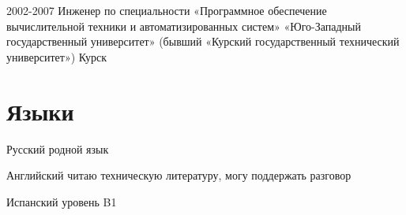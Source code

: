 \documentclass[11pt,a4paper,sans]{moderncv}
\newcommand{\lang}[2]{#1}
\begin{document}
\cventry
    {2002-2007}
    {\lang
        {Инженер по специальности «Программное обеспечение вычислительной техники и автоматизированных систем»}
        {Software of computer facilities and automated systems}}
    {\lang
        {«Юго-Западный государственный университет» (бывший «Курский государственный технический университет»)}
        {South-West State University (ex. Kursk State Technical University)}}
    {\lang
        {Курск}
        {Kursk}}
    {}
    {}

\section
    {\lang
        {Языки}
        {Language Skills}}

\cvlanguage
    {\lang
        {Русский}
        {Russian}}
    {\lang
        {родной язык}
        {Native speaker}}
    {}

\cvlanguage
    {\lang
        {Английский}
        {English}}
    {\lang
        {читаю техническую литературу, могу поддержать разговор}
        {Good reading and translating ability}}
    {}

\cvlanguage
    {\lang
        {Испанский}
        {Spanish}}
    {\lang
        {уровень B1}
        {Nivel B1}}
    {}
\end{document}
